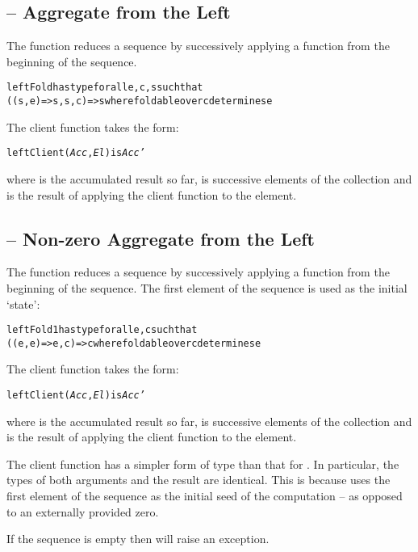\subsection{ -- Aggregate from the Left}
\label{leftFold}
The  function reduces a sequence by successively applying a function from the beginning of the sequence.
\begin{alltt}
leftFold has type for all e,c,s such that
    ((s,e)=>s,s,c) => s where foldable over c determines e
\end{alltt}
The client function takes the form:
\begin{alltt}
leftClient(\emph{Acc},\emph{El}) is \emph{Acc'}
\end{alltt}
where  is the accumulated result so far,  is successive elements of the collection and  is the result of applying the client function to the element.

\subsection{ -- Non-zero Aggregate from the Left}
\label{leftFold1}
The  function reduces a sequence by successively applying a function from the beginning of the sequence. The first element of the sequence is used as the initial `state':
\begin{alltt}
leftFold1 has type for all e,c such that
    ((e,e)=>e,c) => c where foldable over c determines e
\end{alltt}
The client function takes the form:
\begin{alltt}
leftClient(\emph{Acc},\emph{El}) is \emph{Acc'}
\end{alltt}
where  is the accumulated result so far,  is successive elements of the collection and  is the result of applying the client function to the element.

\begin{aside}
The client function has a simpler form of type than that for . In particular, the types of both arguments and the result are identical. This is because  uses the first element of the sequence as the initial seed of the computation -- as opposed to an externally provided zero.
\end{aside}

\begin{aside}
If the sequence is empty then  will raise an exception.
\end{aside}

